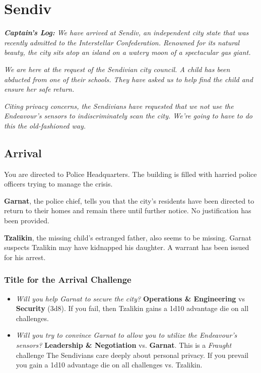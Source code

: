 \section*{Sendiv}
\textit{\textbf{Captain's Log:} We have arrived at Sendiv, an independent city state that was recently admitted to the Interstellar Confederation. Renowned for its natural beauty, the city sits atop an island on a watery moon of a spectacular gas giant.}

\textit{We are here at the request of the Sendivian city council. A child has been abducted from one of their schools. They have asked us to help find the child and ensure her safe return.}

\textit{Citing privacy concerns, the Sendivians have requested that we not use the Endeavour's sensors to indiscriminately scan the city. We're going to have to do this the old-fashioned way.}

\subsection*{Arrival}
You are directed to Police Headquarters. The building is filled with harried police officers trying to manage the crisis. 

\textbf{Garnat}, the police chief, tells you that the city's residents have been directed to return to their homes and remain there until further notice. No justification has been provided.

\textbf{Tzalikin}, the missing child's estranged father, also seems to be missing.  Garnat suspects Tzalikin may have kidnapped his daughter. A warrant has been issued for his arrest.

\subsubsection*{Title for the Arrival Challenge}
\begin{itemize}
	\item \textit{Will you help Garnat to secure the city?} \textbf{Operations \& Engineering} vs \textbf{Security} (3d8). If you fail, then Tzalikin gains a 1d10 advantage die on all challenges.
	\item \textit{Will you try to convince Garnat to allow you to utilize the Endeavour's sensors?} \textbf{Leadership \& Negotiation} vs. \textbf{Garnat}. This is a \textit{Fraught} challenge \textemdash{} The Sendivians care deeply about personal privacy. If you prevail you gain a 1d10 advantage die on all challenges vs. Tzalikin.
\end{itemize}
\newpage

